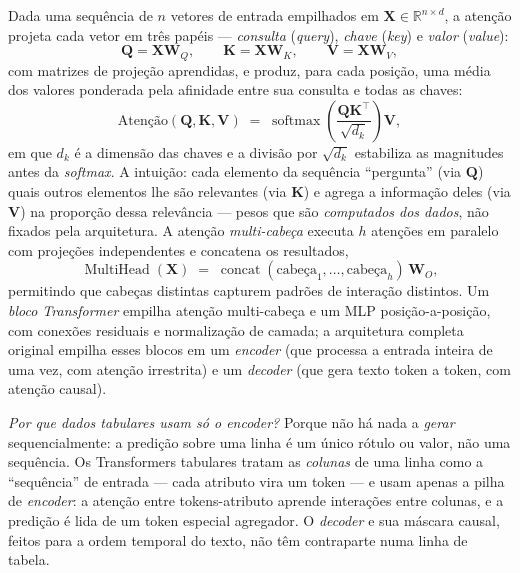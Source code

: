 Dada uma sequência de $n$ vetores de entrada empilhados em
$\mathbf{X} \in \mathbb{R}^{n \times d}$, a atenção projeta cada vetor em
três papéis --- \emph{consulta} (\emph{query}), \emph{chave} (\emph{key}) e
\emph{valor} (\emph{value}):
\begin{equation}
  \mathbf{Q} = \mathbf{X}\mathbf{W}_Q, \qquad
  \mathbf{K} = \mathbf{X}\mathbf{W}_K, \qquad
  \mathbf{V} = \mathbf{X}\mathbf{W}_V,
  \label{eq:qkv}
\end{equation}
com matrizes de projeção aprendidas, e produz, para cada posição, uma média
dos valores ponderada pela afinidade entre sua consulta e todas as chaves:
\begin{equation}
  \text{Atenção}(\mathbf{Q}, \mathbf{K}, \mathbf{V})
  \;=\; \operatorname{softmax}\!\left(
    \frac{\mathbf{Q}\mathbf{K}^{\top}}{\sqrt{d_k}}
  \right)\mathbf{V},
  \label{eq:atencao}
\end{equation}
em que $d_k$ é a dimensão das chaves e a divisão por $\sqrt{d_k}$ estabiliza
as magnitudes antes da \emph{softmax}. A intuição: cada elemento da
sequência ``pergunta'' (via $\mathbf{Q}$) quais outros elementos lhe são
relevantes (via $\mathbf{K}$) e agrega a informação deles (via $\mathbf{V}$)
na proporção dessa relevância --- pesos que são \emph{computados dos
dados}, não fixados pela arquitetura. A atenção \emph{multi-cabeça} executa
$h$ atenções em paralelo com projeções independentes e concatena os
resultados,
\begin{equation}
  \operatorname{MultiHead}(\mathbf{X}) \;=\;
  \operatorname{concat}(\text{cabeça}_1, \ldots, \text{cabeça}_h)\,
  \mathbf{W}_O,
  \label{eq:multihead}
\end{equation}
permitindo que cabeças distintas capturem padrões de interação distintos. Um
\emph{bloco Transformer} empilha atenção multi-cabeça e um MLP
posição-a-posição, com conexões residuais e normalização de camada; a
arquitetura completa original empilha esses blocos em um \emph{encoder}
(que processa a entrada inteira de uma vez, com atenção irrestrita) e um
\emph{decoder} (que gera texto token a token, com atenção causal).

\emph{Por que dados tabulares usam só o \emph{encoder}?} Porque não há
nada a \emph{gerar} sequencialmente: a predição sobre uma linha é um único
rótulo ou valor, não uma sequência. Os Transformers tabulares tratam as
\emph{colunas} de uma linha como a ``sequência'' de entrada --- cada
atributo vira um token --- e usam apenas a pilha de \emph{encoder}: a
atenção entre tokens-atributo aprende interações entre colunas, e a
predição é lida de um token especial agregador. O \emph{decoder} e sua
máscara causal, feitos para a ordem temporal do texto, não têm contraparte
numa linha de tabela.

